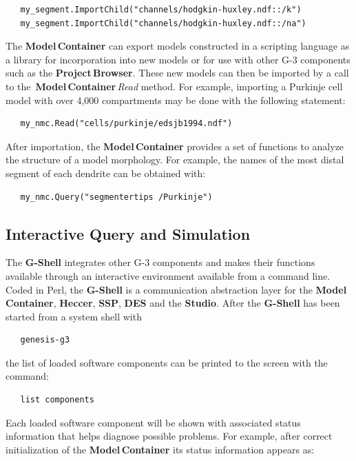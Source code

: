 \documentclass[10pt]{article}
\begin{document}
\begin{verbatim}
   my_segment.ImportChild("channels/hodgkin-huxley.ndf::/k")
   my_segment.ImportChild("channels/hodgkin-huxley.ndf::/na")
\end{verbatim}

The {\bf Model\,Container} can export models constructed in a
scripting language as a library for incorporation into new models or
for use with other G-3 components such as the {\bf Project\,Browser}.
These new models can then be imported by a call to the\,{\bf
  Model\,Container}\,{\it Read} method. For example, importing a
Purkinje cell model with over 4,000 compartments may be done with the
following statement:

\begin{verbatim}
   my_nmc.Read("cells/purkinje/edsjb1994.ndf")
\end{verbatim}

After importation, the {\bf Model\,Container} provides a set of
functions to analyze the structure of a model morphology.  For
example, the names of the most distal segment of each dendrite can be
obtained with:

\begin{verbatim}
   my_nmc.Query("segmentertips /Purkinje")
\end{verbatim}

\subsection*{Interactive Query and Simulation}

The {\bf G-Shell} integrates other
G-3 components and makes their functions available through an
interactive environment available from a command line.  Coded in Perl, the {\bf G-Shell} is a
communication abstraction layer for 
the {\bf Model\,Container}, {\bf Heccer}, {\bf SSP}, {\bf DES} and the {\bf
  Studio}.  After the {\bf G-Shell} has been started from a system
shell with
\begin{verbatim}
   genesis-g3
\end{verbatim}
the list of loaded software components can be printed to the screen with the command:

\begin{verbatim}
   list components
\end{verbatim}

Each loaded software component will be shown with associated status
information that helps diagnose possible problems.  For
example, after correct initialization of the {\bf Model\,Container} its
status information appears as:
\end{document}
